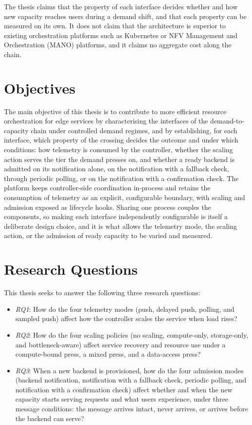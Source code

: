 ﻿\documentclass[12pt,reqno,twoside]{amsbook}
\begin{document}
The thesis claims that the property of each interface decides whether and how new
capacity reaches users during a demand shift, and that each property can be
measured on its own. It does not claim that the architecture is superior to
existing orchestration platforms such as Kubernetes or NFV Management and
Orchestration (MANO) platforms, and it claims no aggregate cost along the
chain.

\section{Objectives}\label{sec:objectives} %
The main objective of this thesis is to contribute to more efficient
resource orchestration for edge services by characterising the
interfaces of the demand-to-capacity chain under controlled demand regimes,
and by establishing, for each interface, which property of the crossing
decides the outcome and under which conditions: how telemetry is consumed by the
controller, whether the scaling action serves the tier the
demand presses on, and whether a ready backend is admitted on its
notification alone, on the notification with a fallback check, through
periodic polling, or on the notification with a confirmation check. The
platform keeps controller-side coordination in-process and retains the
consumption of telemetry as an explicit, configurable boundary, with scaling
and admission exposed as lifecycle hooks. Sharing one process couples the
components, so making each interface independently configurable is itself a
deliberate design choice, and it is what allows the telemetry mode, the scaling
action, or the admission of ready capacity to be varied and measured.

\section{Research Questions}\label{sec:research_questions} %
This thesis seeks to answer the following three research questions:

\begin{itemize}
    \item \textit{RQ1}: How do the four telemetry modes (push, delayed
    push, polling, and sampled push) affect how the controller scales the
    service when load rises?

    \item \textit{RQ2}: How do the four scaling policies (no scaling,
    compute-only, storage-only, and bottleneck-aware) affect service recovery
    and resource use under a compute-bound press, a mixed press, and a
    data-access press?

    \item \textit{RQ3}: When a new backend is provisioned,
    how do the four admission modes (backend notification, notification
    with a fallback check, periodic polling, and notification with a
    confirmation check) affect whether and when the new
    capacity starts serving requests and what users experience, under
    three message conditions: the message arrives intact, never arrives,
    or arrives before the backend can serve?
\end{itemize}
\end{document}
